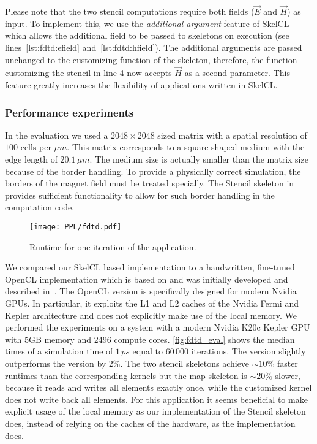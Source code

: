 Please note that the two stencil computations require both fields ($\vec{E}$ and $\vec{H}$) as input.
To implement this, we use the \emph{additional argument} feature of SkelCL which allows the additional field to be passed to skeletons on execution (see lines~\ref{lst:fdtd:efield} and~\ref{lst:fdtd:hfield}).
The additional arguments are passed unchanged to the customizing function of the skeleton, therefore, the function customizing the stencil in line 4 now accepts $\vec{H}$ as a second parameter.
This feature greatly increases the flexibility of applications written in SkelCL.


\subsubsection*{Performance experiments}

In the evaluation we used a $2048 \times 2048$ sized matrix with a spatial resolution of $100$ cells per $\mu m$.
This matrix corresponds to a square-shaped medium with the edge length of $20.1\,\mu m$.
The medium size is actually smaller than the matrix size because of the border handling.
To provide a physically correct simulation, the borders of the magnet field must be treated specially.
The Stencil skeleton in \SkelCL provides sufficient functionality to allow for such border handling in the computation code.

\begin{figure}[t]
    \centering
    \texttt{[image: PPL/fdtd.pdf]}
    \caption{\small Runtime for one iteration of the \FDTD application.}
    \label{fig:fdtd_eval}
\end{figure}

We compared our SkelCL based implementation to a handwritten, fine-tuned OpenCL implementation which is based on \cite{Knitter2013} and was initially developed and described in~\cite{Haidl2011}.
The OpenCL version is specifically designed for modern Nvidia GPUs.
In particular, it exploits the L1 and L2 caches of the Nvidia Fermi and Kepler architecture and does not explicitly make use of the local memory.
We performed the experiments on a system with a modern Nvidia K20c Kepler GPU with 5GB memory and 2496 compute cores.
\autoref{fig:fdtd_eval} shows the median times of a simulation time of $1\,ps$ equal to $60\, 000$ iterations.
The \SkelCL version slightly outperforms the \OpenCL version by $2\%$.
The two stencil skeletons achieve ${\sim}10\%$ faster runtimes than the corresponding \OpenCL kernels but the map skeleton is ${\sim}20\%$ slower, because it reads and writes all elements exactly once, while the customized \OpenCL kernel does not write back all elements.
For this application it seems beneficial to make explicit usage of the local memory as our implementation of the Stencil skeleton does, instead of relying on the caches of the hardware, as the \OpenCL implementation does.

